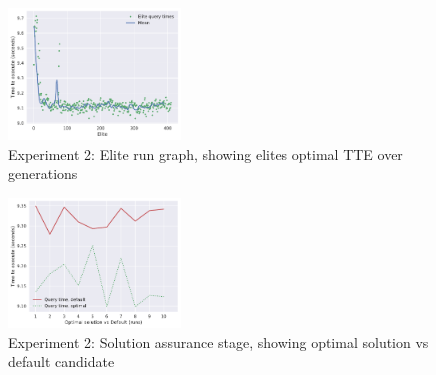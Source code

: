 \documentclass[a4paper,english]{report}
\begin{document}
	\begin{figure}[H]
		\centering
		\includegraphics[width=130pt]{runlogs/final2/3}
		\caption{Experiment 2: Elite run graph, showing elites optimal TTE over generations}
		\label{fig:final23}
	\end{figure}
	\begin{figure}[H]
		\centering
		\includegraphics[width=130pt]{runlogs/final2/4}
		\caption{Experiment 2: Solution assurance stage, showing optimal solution vs default candidate}
		\label{fig:final24}
	\end{figure}
	\clearpage
\end{document}
